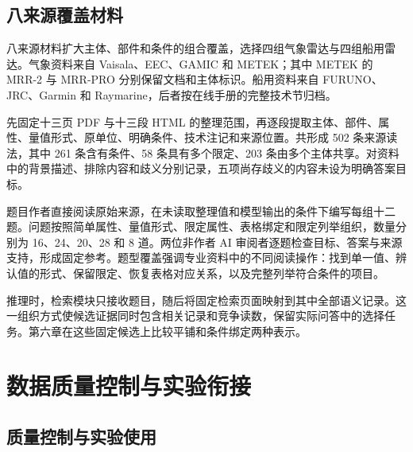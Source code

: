 \subsection{八来源覆盖材料}

八来源材料扩大主体、部件和条件的组合覆盖，选择四组气象雷达与四组船用雷达。气象资料来自 Vaisala、EEC、GAMIC 和 METEK；其中 METEK 的 MRR-2 与 MRR-PRO 分别保留文档和主体标识\cite{source-v2-vaisala-wrs300,source-v2-eec-ranger,source-v2-gamic-gmwr,source-v2-metek-mrr2,source-v2-metek-mrrpro}。船用资料来自 FURUNO、JRC、Garmin 和 Raymarine，后者按在线手册的完整技术节归档\cite{source-v2-furuno-nxt,source-v2-jrc-5200,source-v2-garmin-fantom,source-v2-raymarine-cyclone}。

先固定十三页 PDF 与十三段 HTML 的整理范围，再逐段提取主体、部件、属性、量值形式、原单位、明确条件、技术注记和来源位置。共形成 502 条来源读法，其中 261 条含有条件、58 条具有多个限定、203 条由多个主体共享。对资料中的背景描述、排除内容和歧义分别记录，五项尚存歧义的内容未设为明确答案目标。

\begin{table}[htbp]
\centering\small
\caption{八来源材料的结构与条件覆盖}
\label{tab:data-coverage}
\DataCoverageTable
\end{table}

题目作者直接阅读原始来源，在未读取整理值和模型输出的条件下编写每组十二题。问题按照简单属性、量值形式、限定属性、表格绑定和限定列举组织，数量分别为 16、24、20、28 和 8 道。两位非作者 AI 审阅者逐题检查目标、答案与来源支持，形成固定参考。题型覆盖强调专业资料中的不同阅读操作：找到单一值、辨认值的形式、保留限定、恢复表格对应关系，以及完整列举符合条件的项目。

推理时，检索模块只接收题目，随后将固定检索页面映射到其中全部语义记录。这一组织方式使候选证据同时包含相关记录和竞争读数，保留实际问答中的选择任务。第六章在这些固定候选上比较平铺和条件绑定两种表示。



\section{数据质量控制与实验衔接}



\subsection{质量控制与实验使用}

